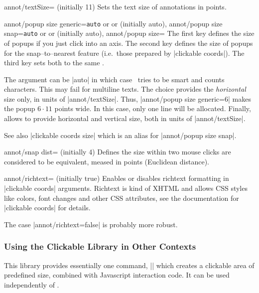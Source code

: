 \begin{pgfplotskey}{annot/textSize= (initially 11)}
	Sets the text size of annotations in points.
\end{pgfplotskey}

\begin{pgfplotskeylist}{%
	annot/popup size generic=\texttt{auto} or  or  (initially auto),%
	annot/popup size snap=\texttt{auto} or  or  (initially auto),%
	annot/popup size=}%
	The first key defines the size of popups if you just click into an axis. The second key defines the size of popups for the snap--to--nearest feature (i.e.\ those prepared by |clickable coords|). The third key sets both to the same .

	The argument can be |auto| in which case \PGFPlots\ tries to be smart and counts characters. This may fail for multiline texts. The choice  provides the \emph{horizontal} size only, in units of |annot/textSize|. Thus, |annot/popup size generic=6| makes the popup $6\cdot 11$ points wide. In this case, only one line will be allocated. Finally,  allows to provide horizontal and vertical size, both in units of |annot/textSize|.

	See also |clickable coords size| which is an alias for |annot/popup size snap|.
\end{pgfplotskeylist}


\begin{pgfplotskey}{annot/snap dist= (initially 4)}
	Defines the size within two mouse clicks are considered to be equivalent, meased in points (Euclidean distance).
\end{pgfplotskey}

\begin{pgfplotskey}{annot/richtext= (initially true)}
	Enables or disables richtext formatting in |clickable coords| arguments. Richtext is kind of XHTML and allows CSS styles like colors, font changes and other CSS attributes, see the documentation for |clickable coords| for details.

	The case |annot/richtext=false| is probably more robust.
\end{pgfplotskey}

\subsubsection{Using the Clickable Library in Other Contexts}
This library provides essentially one command, |\pgfplotsclickablecreate| which creates a clickable area of predefined size, combined with Javascript interaction code. It can be used independently of \PGFPlots.

